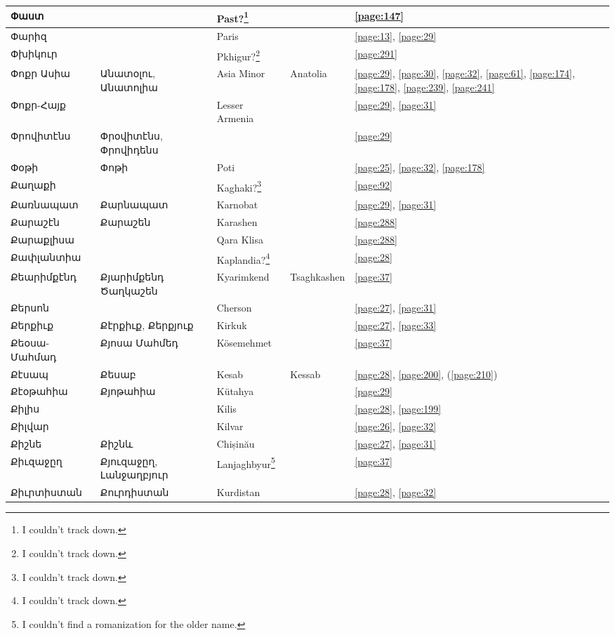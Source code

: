 \begin{center}
\begin{longtable}{|p{}|p{3cm}|p{3cm}|p{2cm}|p{3cm}|}
	Փաստ& & Past?\footnote{I couldn't track down.}& &\ref{page:147}\\ \hline
	Փարիզ& & Paris& &\ref{page:13}, \ref{page:29}\\ \hline
	Փխիկուր& &Pkhigur?\footnote{I couldn't track down.} & &\ref{page:291}\\ \hline
	Փոքր Ասիա &Անատօլու, Անատոլիա &
	Asia Minor&Anatolia &\ref{page:29}, \ref{page:30}, \ref{page:32}, \ref{page:61}, \ref{page:174}, \ref{page:178}, \ref{page:239}, \ref{page:241}\\ \hline
	Փոքր-Հայք& &Lesser Armenia & &\ref{page:29}, \ref{page:31}\\ \hline
	Փրովիտէնս& Փրօվիտէնս, Փրովիդենս& & &\ref{page:29}\\ \hline
	Փօթի& Փոթի& Poti& &\ref{page:25}, \ref{page:32}, \ref{page:178}\\ \hline
	Քաղաքի& &Kaghaki?\footnote{I couldn't track down.} & &\ref{page:92}\\ \hline
	Քառնապատ&Քարնապատ &Karnobat & &\ref{page:29}, \ref{page:31}\\ \hline
	Քարաշէն& Քարաշեն&Karashen   & &\ref{page:288}\\ \hline
	Քարաքլիսա& &Qara Klisa & &\ref{page:288}\\ \hline
	Քափլանտիա& &Kaplandia?\footnote{I couldn't track down.} & &\ref{page:28}\\ \hline
	Քեարիմքէնդ&Քյարիմքենդ  Ծաղկաշեն& Kyarimkend&Tsaghkashen &\ref{page:37}\\ \hline
	Քերսոն& &Cherson & &\ref{page:27}, \ref{page:31}\\ \hline
	Քերքիւք&Քէրքիւք, Քերքյուք &Kirkuk & &\ref{page:27}, \ref{page:33}\\ \hline
	Քեօսա-Մահմադ& Քյոսա Մահմեդ&Kösemehmet & &\ref{page:37}\\ \hline
	Քէսապ&Քեսաբ &Kesab &Kessab &\ref{page:28}, \ref{page:200}, (\ref{page:210})\\ \hline
	Քէօթահիա&   Քյոթահիա &Kütahya & &\ref{page:29}\\ \hline
	Քիլիս& &Kilis & &\ref{page:28}, \ref{page:199}\\ \hline
	Քիլվար& & Kilvar& &\ref{page:26}, \ref{page:32}\\ \hline
	Քիշնե& Քիշնև& Chișinău& &\ref{page:27}, \ref{page:31}\\ \hline
	Քիւզաջըղ& Քյուզաջըղ, Լանջաղբյուր& Lanjaghbyur\footnote{I couldn't find a romanization for the older name.} & &\ref{page:37}\\ \hline
	Քիւրտիստան& Քուրդիստան&Kurdistan & &\ref{page:28}, \ref{page:32}\\ \hline

\end{longtable}
\end{center}
